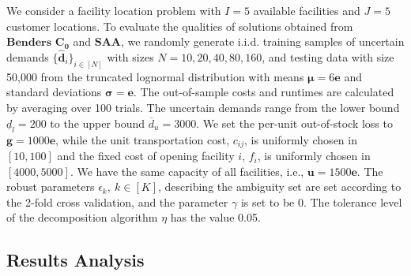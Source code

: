 \documentclass{article}
\begin{document}
We consider a facility location problem with $I=5$ available facilities and $J=5$ customer locations. To evaluate the qualities of solutions obtained from $\textbf{Benders $\mathbf{C_0}$}$ and $\textbf{SAA}$, we randomly generate i.i.d. training samples of uncertain demands $\{\hat{\bm d}_i\}_{i \in [N]}$ with sizes $N = 10,20,40,80,160$, and testing data with size 50,000 from the truncated lognormal distribution with means $\bm \mu = 6\mathbf{e}$ and standard deviations $\bm \sigma = \mathbf{e}$. The out-of-sample costs and runtimes are calculated by averaging over 100 trials. The uncertain demands range from the lower bound $\underline{d}_l = 200$ to the upper bound $\overline{d}_u = 3000$. We set the per-unit out-of-stock loss to $\bm g = 1000\mathbf{e}$, while the unit transportation cost, $c_{ij}$, is uniformly chosen in $[10,100]$ and the fixed cost of opening facility $i$, $f_i$, is uniformly chosen in $[4000,5000]$. We have the same capacity of all facilities, i.e., $\bm u = 1500\mathbf{e}$. The robust parameters $\epsilon_k, \ k \in [K]$, describing the ambiguity set are set according to the 2-fold cross validation, and the parameter $\gamma$ is set to be 0. The tolerance level of the decomposition algorithm $\eta$ has the value 0.05.

\subsection{Results Analysis}


\begin{figure}
\begin{floatrow}[2]
\end{floatrow}
\end{figure}
\end{document}
